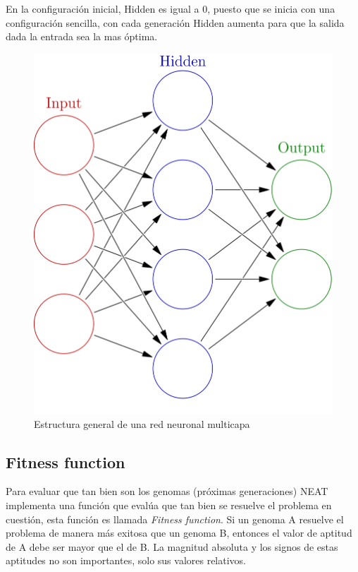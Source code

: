 \documentclass[lettersize, journal]{IEEEtran}
\begin{document}
En la configuración inicial, Hidden es igual a 0, puesto que se inicia con una configuración sencilla, con cada generación Hidden aumenta para que la salida dada la entrada sea la mas óptima.

\begin{figure}
    \centering    \includegraphics[width=0.4\linewidth]{images/neural_network.png}
    \caption{Estructura general de una red neuronal multicapa \cite{red_neuronal}}
    \label{fig:Red-neuronal}
\end{figure}

\subsection{Fitness function}
Para evaluar que tan bien son los genomas (próximas generaciones) NEAT implementa una función que evalúa que tan bien se resuelve el problema en cuestión, esta función es llamada \textit{Fitness function}. Si un genoma A resuelve el problema de manera más exitosa que un genoma B, entonces el valor de aptitud de A debe ser mayor que el de B. La magnitud absoluta y los signos de estas aptitudes no son importantes, solo sus valores relativos.
\end{document}
